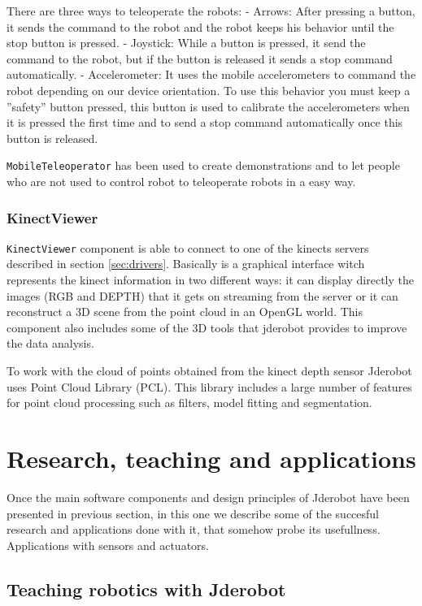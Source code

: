 \documentclass[twocolumn]{svjour3}          %
\begin{document}
There are three ways to teleoperate the robots:
- Arrows: After pressing a button, it sends the command to the robot and the robot keeps his behavior until the stop button is pressed.
- Joystick: While a button is pressed, it send the command to the robot, but if the button is released it sends a stop command automatically.
- Accelerometer: It uses the mobile accelerometers to command the robot depending on our device orientation. To use this behavior you must keep a ''safety'' button pressed, this button is used to calibrate the accelerometers when it is pressed the first time and to send a stop command automatically once this button is released.

\texttt{MobileTeleoperator} has been used to create demonstrations and to let people who are not used to control robot to teleoperate robots in a easy way.

\subsubsection{KinectViewer}

\texttt{KinectViewer} component is able to connect to one of the kinects servers described in section \ref{sec:drivers}. Basically is a graphical interface witch represents the kinect information in two different ways: it can display directly the images (RGB and DEPTH) that it gets on streaming from the server or it can reconstruct a 3D scene from the point cloud in an OpenGL world. This component also includes some of the 3D tools that jderobot provides to improve the data analysis. 

To work with the cloud of points obtained from the kinect depth sensor Jderobot uses Point Cloud Library (PCL). This library includes a large number of features for point cloud processing such as filters, model fitting and segmentation. 

\section{Research, teaching and applications}
\label{sec:applications}

Once the main software components and design principles of Jderobot have been presented in previous section, in this one we describe some of the succesful research and applications done with it, that somehow probe its usefullness. Applications with sensors and actuators.

\subsection{Teaching robotics with Jderobot}
\end{document}
